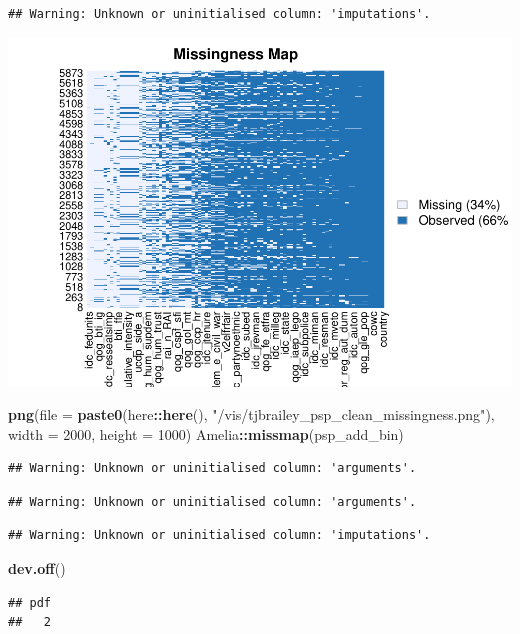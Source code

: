 \documentclass[
]{article}
\newenvironment{Shaded}{\begin{snugshade}}{\end{snugshade}}
\newcommand{\DataTypeTok}[1]{\textcolor[rgb]{0.13,0.29,0.53}{#1}}
\newcommand{\DecValTok}[1]{\textcolor[rgb]{0.00,0.00,0.81}{#1}}
\newcommand{\KeywordTok}[1]{\textcolor[rgb]{0.13,0.29,0.53}{\textbf{#1}}}
\newcommand{\NormalTok}[1]{#1}
\newcommand{\OperatorTok}[1]{\textcolor[rgb]{0.81,0.36,0.00}{\textbf{#1}}}
\newcommand{\StringTok}[1]{\textcolor[rgb]{0.31,0.60,0.02}{#1}}
\begin{document}
\begin{verbatim}
## Warning: Unknown or uninitialised column: 'imputations'.
\end{verbatim}

\includegraphics{01_tjbrailey_wrangle_data_files/figure-latex/unnamed-chunk-20-1.pdf}

\begin{Shaded}
\begin{Highlighting}[]
\KeywordTok{png}\NormalTok{(}\DataTypeTok{file =} \KeywordTok{paste0}\NormalTok{(here}\OperatorTok{::}\KeywordTok{here}\NormalTok{(), }\StringTok{"/vis/tjbrailey_psp_clean_missingness.png"}\NormalTok{),}
    \DataTypeTok{width =} \DecValTok{2000}\NormalTok{, }
    \DataTypeTok{height =} \DecValTok{1000}\NormalTok{)}
\NormalTok{Amelia}\OperatorTok{::}\KeywordTok{missmap}\NormalTok{(psp_add_bin)}
\end{Highlighting}
\end{Shaded}

\begin{verbatim}
## Warning: Unknown or uninitialised column: 'arguments'.
\end{verbatim}

\begin{verbatim}
## Warning: Unknown or uninitialised column: 'arguments'.
\end{verbatim}

\begin{verbatim}
## Warning: Unknown or uninitialised column: 'imputations'.
\end{verbatim}

\begin{Shaded}
\begin{Highlighting}[]
\KeywordTok{dev.off}\NormalTok{()}
\end{Highlighting}
\end{Shaded}

\begin{verbatim}
## pdf 
##   2
\end{verbatim}
\end{document}
